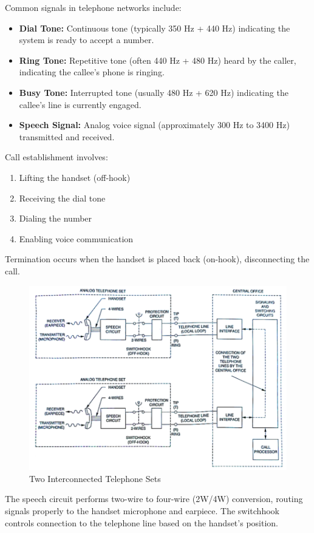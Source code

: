 \documentclass[a4paper,12pt]{article}
\begin{document}
	Common signals in telephone networks include:
	\begin{itemize}
		\item \textbf{Dial Tone:} Continuous tone (typically 350 Hz + 440 Hz) indicating the system is ready to accept a number.
		\item \textbf{Ring Tone:} Repetitive tone (often 440 Hz + 480 Hz) heard by the caller, indicating the callee's phone is ringing.
		\item \textbf{Busy Tone:} Interrupted tone (usually 480 Hz + 620 Hz) indicating the callee's line is currently engaged.
		\item \textbf{Speech Signal:} Analog voice signal (approximately 300 Hz to 3400 Hz) transmitted and received.
	\end{itemize}
	
	Call establishment involves:
	\begin{enumerate}
		\item Lifting the handset (off-hook)
		\item Receiving the dial tone
		\item Dialing the number
		\item Enabling voice communication
	\end{enumerate}
	
	Termination occurs when the handset is placed back (on-hook), disconnecting the call.
	
	\begin{figure}[H]
		\centering
	\includegraphics[width=0.71\linewidth]{Images/2}
		\caption{Two Interconnected Telephone Sets}
		\label{fig:interconnected}
	\end{figure}
	
	The speech circuit performs two-wire to four-wire (2W/4W) conversion, routing signals properly to the handset microphone and earpiece. The switchhook controls connection to the telephone line based on the handset's position.
	
\end{document}
